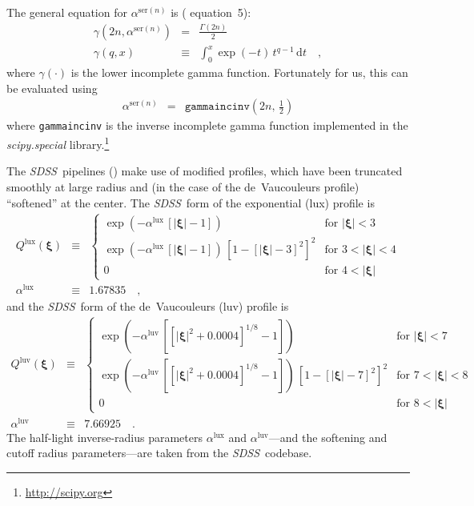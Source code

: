 \documentclass[12pt,pdftex,preprint]{aastex}
\newcommand{\project}[1]{\textsl{#1}}
\newcommand{\sdss}{\project{SDSS}}
\newcommand{\tvector}[1]{\boldsymbol{#1}}
\newcommand{\spos}{\tvector{\xi}}
\newcommand{\ser}{\mathrm{ser}}
\newcommand{\lux}{\mathrm{lux}}
\newcommand{\luv}{\mathrm{luv}}
\begin{document}
The general equation for $\alpha^{\ser(n)}$ is (\citealt{ciotti} equation~5):
\begin{eqnarray}
\gamma(2 n, \alpha^{\ser(n)}) &=& \frac{\Gamma(2 n)}{2}
\\
\gamma(q, x) &\equiv& \int_0^x \exp(-t) \, t^{q-1} \, \mathrm{d}t
\quad ,
\end{eqnarray}
where $\gamma(\cdot)$ is the lower incomplete gamma function.
Fortunately for us, this can be evaluated using
\begin{eqnarray}
\alpha^{\ser(n)} &=& \texttt{gammaincinv}(2 n, \, \frac{1}{2})
\end{eqnarray}
where \texttt{gammaincinv} is the inverse incomplete gamma function implemented
in the \project{scipy.special} library.\footnote{\url{http://scipy.org}}

The \sdss\ pipelines (\citealt{lupton}) make use of modified profiles,
which have been truncated smoothly at large radius and (in the case of
the de~Vaucouleurs profile) ``softened'' at the center.  The
\sdss\ form of the exponential (lux) profile is
\begin{eqnarray}\displaystyle
Q^{\lux}(\spos) &\equiv& \left\{\begin{array}{ll}
  \exp(-\alpha^{\lux}\,[|\spos| - 1]) & \mbox{for~}|\spos| < 3 \\
  \exp(-\alpha^{\lux}\,[|\spos| - 1])
  \,\left[1 - [|\spos| - 3]^2\right]^2 & \mbox{for~}3 < |\spos| < 4 \\
  0                                   & \mbox{for~}4 < |\spos|
\end{array}\right.
\\
\alpha^{\lux} &\equiv& 1.67835
\quad ,
\end{eqnarray}
and the \sdss\ form of the de~Vaucouleurs (luv) profile is
\begin{eqnarray}\displaystyle
Q^{\luv}(\spos) &\equiv& \left\{\begin{array}{ll}
  \exp(-\alpha^{\luv}\,\left[[|\spos|^2 + 0.0004]^{1/8} - 1\right]) & \mbox{for~}|\spos| < 7 \\
  \exp(-\alpha^{\luv}\,\left[[|\spos|^2 + 0.0004]^{1/8} - 1\right])
  \,\left[1 - [|\spos| - 7]^2\right]^2 & \mbox{for~}7 < |\spos| < 8 \\
  0                                   & \mbox{for~}8 < |\spos|
\end{array}\right.
\\
\alpha^{\luv} &\equiv& 7.66925
\quad .
\end{eqnarray}
The half-light inverse-radius parameters $\alpha^{\lux}$ and
$\alpha^{\luv}$---and the softening and cutoff radius parameters---are
taken from the \sdss\ codebase.
\end{document}
